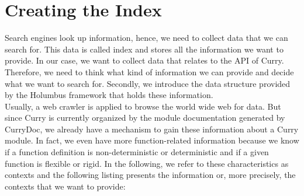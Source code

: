 \documentclass[%
	latex,%
	a4paper,%
	oneside,%
	chapterprefix,%
	headsepline,%
	12pt%
]{scrbook}
\begin{document}





\section{Creating the Index}\label{analysis:indexer}
Search engines look up information, hence, we need to collect data
that we can search for. %
This data is called index and stores all the information we want to
provide. %
In our case, we want to collect data that relates to the API of
Curry. %
Therefore, we need to think what kind of information we can provide
and decide what we want to search for. %
Secondly, we introduce the data structure provided by the Holumbus
framework that holds these information.\\ %



Usually, a web crawler is applied to browse the world wide web for
data. %
But since Curry is currently organized by the module documentation
generated by CurryDoc, we already have a mechanism to gain these
information about a Curry module. %
In fact, we even have more function-related information %
because we know if a function definition is non-deterministic or
deterministic and if a given function is flexible or rigid. %
In the following, we refer to these characteristics as contexts and the
following listing presents the information or, more precisely, the
contexts that we want to provide: %
\end{document}
